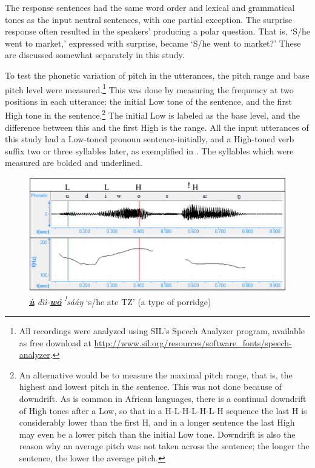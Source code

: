 \documentclass[output=paper]{langsci/langscibook}
\begin{document}
The response sentences had the same word order and lexical and grammatical tones as the input neutral sentences, with one partial exception. The surprise response often resulted in the speakers' producing a polar question. That is, `S/he went to market,' expressed with surprise, became `S/he went to market?' These are discussed somewhat separately in this study. 

To test the phonetic variation of pitch in the utterances, the pitch range and base pitch level were measured.\footnote{All recordings were analyzed using SIL's Speech Analyzer program, available as free download at \url{http://www.sil.org/resources/software_fonts/speech-analyzer}.} This was done by measuring the frequency at two positions in each utterance: the initial Low tone of the sentence, and the first High tone in the sentence.\footnote{An alternative would be to measure the maximal pitch range, that is, the highest and lowest pitch in the sentence. This was not done because of downdrift. As is common in African languages, there is a continual downdrift of High tones after a Low, so that in a H-L-H-L-H-L-H sequence the last H is considerably lower than the first H, and in a longer sentence the last High may even be a lower pitch than the initial Low tone. Downdrift is also the reason why an average pitch was not taken across the sentence; the longer the sentence, the lower the average pitch.} The initial Low is labeled as the base level, and the difference between this and the first High is the range. All the input utterances of this study had a Low-toned pronoun sentence-initially, and a High-toned verb suffix two or three syllables later, as exemplified in . The syllables which were measured are bolded and underlined.


\begin{figure}[h]
\includegraphics[width=\textwidth]{figures/cahillfig1}
\caption{\textit{\textbf{\underline{ù}} dìì-\textbf{\underline{wó}} \textit{\textsuperscript{!}}sááŋ}  `s/he ate TZ' (a type of porridge)}
\label{fig:1.cahill}
\end{figure}
\end{document}
